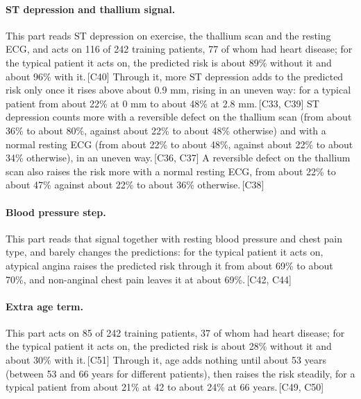 \documentclass[a4paper,10pt]{article}
\newif\ifreviewmarks
\newcommand{\reviewrule}{\noindent{\color{BrickRed}\rule{\linewidth}{0.8pt}}}
\newenvironment{drafted}[1][]{%
  \ifreviewmarks\par\addvspace{\medskipamount}\reviewrule\par\nopagebreak
  \noindent{\color{BrickRed}\sffamily\footnotesize\textbf{Thesis Draft}\quad #1\hfill review}\par\nopagebreak\smallskip\fi}{%
  \ifreviewmarks\par\smallskip\noindent{\color{BrickRed}\sffamily\footnotesize end of thesis draft}\par\nopagebreak\reviewrule\par\medskip\fi}
\begin{document}
\begin{drafted}[plain-language layer: heart-s5-c1]
\paragraph{ST depression and thallium signal.} This part reads ST depression on exercise, the thallium scan and the resting ECG, and acts on 116 of 242 training patients, 77 of whom had heart disease; for the typical patient it acts on, the predicted risk is about 89\% without it and about 96\% with it.\,{\scriptsize\textcolor{NavyBlue}{[C40]}} Through it, more ST depression adds to the predicted risk only once it rises above about 0.9 mm, rising in an uneven way: for a typical patient from about 22\% at 0 mm to about 48\% at 2.8 mm.\,{\scriptsize\textcolor{NavyBlue}{[C33, C39]}} ST depression counts more with a reversible defect on the thallium scan (from about 36\% to about 80\%, against about 22\% to about 48\% otherwise) and with a normal resting ECG (from about 22\% to about 48\%, against about 22\% to about 34\% otherwise), in an uneven way.\,{\scriptsize\textcolor{NavyBlue}{[C36, C37]}} A reversible defect on the thallium scan also raises the risk more with a normal resting ECG, from about 22\% to about 47\% against about 22\% to about 36\% otherwise.\,{\scriptsize\textcolor{NavyBlue}{[C38]}}
\paragraph{Blood pressure step.} This part reads that signal together with resting blood pressure and chest pain type, and barely changes the predictions: for the typical patient it acts on, atypical angina raises the predicted risk through it from about 69\% to about 70\%, and non-anginal chest pain leaves it at about 69\%.\,{\scriptsize\textcolor{NavyBlue}{[C42, C44]}}
\paragraph{Extra age term.} This part acts on 85 of 242 training patients, 37 of whom had heart disease; for the typical patient it acts on, the predicted risk is about 28\% without it and about 30\% with it.\,{\scriptsize\textcolor{NavyBlue}{[C51]}} Through it, age adds nothing until about 53 years (between 53 and 66 years for different patients), then raises the risk steadily, for a typical patient from about 21\% at 42 to about 24\% at 66 years.\,{\scriptsize\textcolor{NavyBlue}{[C49, C50]}}

\end{drafted}
\end{document}
